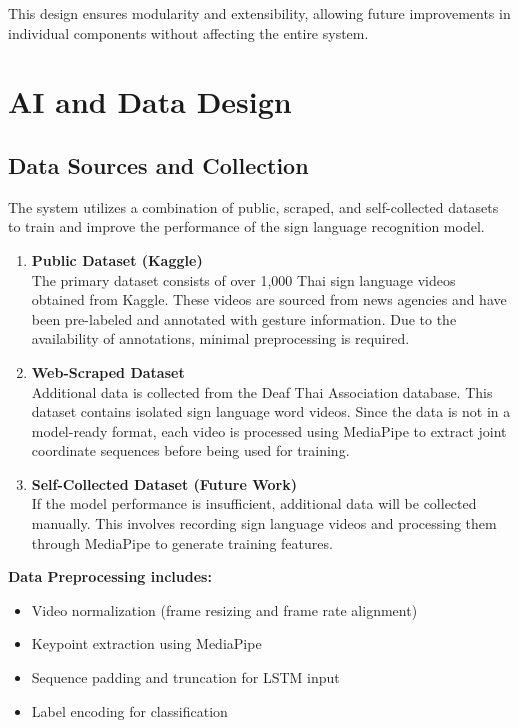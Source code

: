 This design ensures modularity and extensibility, allowing future improvements in individual components without affecting the entire system.


\section{AI and Data Design}
\label{section:ai-data-design}

\subsection{Data Sources and Collection}

The system utilizes a combination of public, scraped, and self-collected datasets to train and improve the performance of the sign language recognition model.

\begin{enumerate}
    \item \textbf{Public Dataset (Kaggle)} \\
    The primary dataset consists of over 1,000 Thai sign language videos obtained from Kaggle. These videos are sourced from news agencies and have been pre-labeled and annotated with gesture information. Due to the availability of annotations, minimal preprocessing is required.
    
    \item \textbf{Web-Scraped Dataset} \\
    Additional data is collected from the Deaf Thai Association database. This dataset contains isolated sign language word videos. Since the data is not in a model-ready format, each video is processed using MediaPipe to extract joint coordinate sequences before being used for training.
    
    \item \textbf{Self-Collected Dataset (Future Work)} \\
    If the model performance is insufficient, additional data will be collected manually. This involves recording sign language videos and processing them through MediaPipe to generate training features.
\end{enumerate}

\textbf{Data Preprocessing includes:}
\begin{itemize}
    \item Video normalization (frame resizing and frame rate alignment)
    \item Keypoint extraction using MediaPipe
    \item Sequence padding and truncation for LSTM input
    \item Label encoding for classification
\end{itemize}

